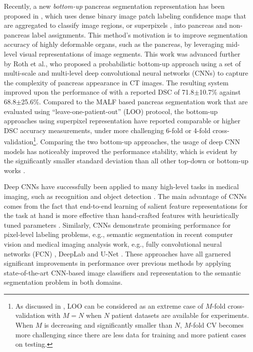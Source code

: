 \documentclass[journal]{IEEEtran}
\begin{document}
Recently, a new {\em bottom-up} pancreas segmentation representation has been proposed in \cite{farag2014bottom}, which uses dense binary image patch labeling confidence maps that are aggregated to classify image regions, or superpixels \cite{Felzenszwalb2004Efficient,pont-tuset2015mcg,Girshick2016Region}, into pancreas and non-pancreas label assignments. This method's motivation is to improve segmentation accuracy of highly deformable organs, such as the pancreas, by leveraging mid-level visual representations of image segments. This work was advanced further by Roth et al.\cite{roth2015deeporgan}, who proposed a probabilistic bottom-up approach using a set of multi-scale and multi-level deep convolutional neural networks (CNNs) to capture the complexity of pancreas appearance in CT images. The resulting system improved upon the performance of \cite{farag2014bottom} with a reported DSC of 71.8$\pm$10.7\% against 68.8$\pm$25.6\%. Compared to the MALF based pancreas segmentation work \cite{wolz2013automated,Chu2013Miccai,tong2015discriminative,okada2015abdominal} that are evaluated using ``leave-one-patient-out'' (LOO) protocol, the bottom-up approaches using superpixel representation \cite{farag2014bottom,roth2015deeporgan} have reported comparable or higher DSC accuracy measurements, under more challenging 6-fold or 4-fold cross-validation\footnote{As discussed in \cite{Shin2016Deep}, LOO can be considered as an extreme case of $M$-fold cross-validation with $M=N$ when $N$ patient datasets are available for experiments. When $M$ is decreasing and significantly smaller than $N$, $M$-fold CV becomes more challenging since there are less data for training and more patient cases on testing.}. Comparing the two bottom-up approaches, the usage of deep CNN models has noticeably improved the performance stability, which is evident by the significantly smaller standard deviation \cite{roth2015deeporgan} than all other top-down or bottom-up works \cite{farag2014bottom,wolz2013automated,Chu2013Miccai,tong2015discriminative,okada2015abdominal}.  

Deep CNNs have successfully been applied to many high-level tasks in medical imaging, such as recognition and object detection \cite{yan2015bodypart}. The main advantage of CNNs comes from the fact that end-to-end learning of salient feature representations for the task at hand is more effective than hand-crafted features with heuristically tuned parameters \cite{zheng2015conditional}. Similarly, CNNs demonstrate promising performance for pixel-level labeling problems, e.g., semantic segmentation in recent computer vision and medical imaging analysis work, e.g., fully convolutional neural networks (FCN) \cite{long2015fully}, DeepLab \cite{chen2014semantic} and U-Net \cite{ronneberger2015unet}. These approaches have all garnered significant improvements in performance over previous methods by applying state-of-the-art CNN-based image classifiers and representation to the semantic segmentation problem in both domains. 
\end{document}
